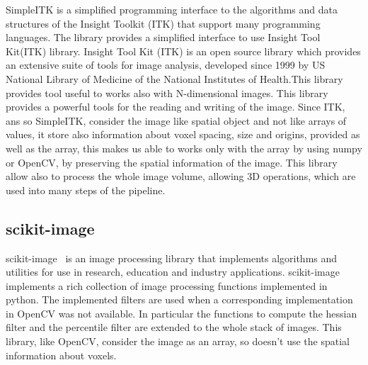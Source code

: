 \documentclass{standalone}
\begin{document}
	SimpleITK is a simplified programming interface to the algorithms and data structures of the Insight Toolkit (ITK) that support many programming languages. The library provides a simplified interface to use Insight Tool Kit(ITK) library. 
	Insight Tool Kit (ITK) is an open source library which provides an extensive suite of tools for image analysis, developed since 1999 by US National Library of Medicine of the National Institutes of Health.This library provides tool useful to works also with N-dimensional images. 
	This library provides a powerful tools for the reading and writing of the image. Since ITK, ans so SimpleITK,  consider the image like spatial object and not like arrays of values, it store also information about voxel spacing, size and origins, provided as well as the array, this makes us able to works only with the array by using numpy or OpenCV, by preserving the spatial information of the image. This library allow also to process the whole image volume, allowing 3D operations, which are used into many steps of the pipeline.
	
	 \subsection{scikit-image}
	 scikit-image~\cite{scikit-image} is an image processing library that implements algorithms and utilities for use in research, education and industry applications. scikit-image implements a rich collection of image processing functions implemented in python. The implemented filters are used when a corresponding implementation in OpenCV was not available. In particular the functions to compute the hessian filter and the percentile filter are extended to the whole stack of images. This library, like OpenCV, consider the image as an array, so doesn't use the spatial information about voxels.
	
	 
\end{document}
